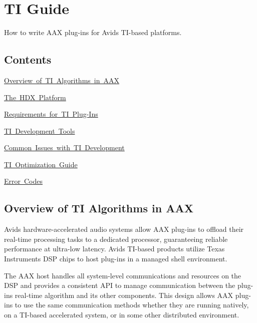 \hypertarget{a00832}{}\section{TI Guide}
\label{a00832}
How to write A\+AX plug-\/ins for Avid\textquotesingle{}s T\+I-\/based platforms. 

\hypertarget{a00832_aax_ti_guide_contents}{}\subsection{Contents}\label{a00832_aax_ti_guide_contents}
\begin{DoxyItemize}
\item \mbox{\hyperlink{a00832_aax_ti_guide_00_overview_of_ti_algorithms}{Overview of TI Algorithms in A\+AX}} \item \mbox{\hyperlink{a00832_aax_ti_guide_01_the_hdx_platform}{The H\+DX Platform}} \item \mbox{\hyperlink{a00832_aax_ti_guide_03_requirements_for_ti_plug_ins}{Requirements for TI Plug-\/\+Ins}} \item \mbox{\hyperlink{a00832_aax_ti_guide_04_ti_development_tools}{TI Development Tools}} \item \mbox{\hyperlink{a00832_aax_ti_guide_05_common_issues_with_ti_development}{Common Issues with TI Development}} \item \mbox{\hyperlink{a00832_aax_ti_guide_06_ti_optimization_guide}{TI Optimization Guide}} \item \mbox{\hyperlink{a00832_aax_ti_guide_07_error_codes}{Error Codes}}\end{DoxyItemize}
 \hypertarget{a00832_aax_ti_guide_00_overview_of_ti_algorithms}{}\subsection{Overview of T\+I Algorithms in A\+AX}\label{a00832_aax_ti_guide_00_overview_of_ti_algorithms}
Avid\textquotesingle{}s hardware-\/accelerated audio systems allow A\+AX plug-\/ins to offload their real-\/time processing tasks to a dedicated processor, guaranteeing reliable performance at ultra-\/low latency. Avid\textquotesingle{}s T\+I-\/based products utilize Texas Instruments D\+SP chips to host plug-\/ins in a managed shell environment.

The A\+AX host handles all system-\/level communications and resources on the D\+SP and provides a consistent A\+PI to manage communication between the plug-\/in\textquotesingle{}s real-\/time algorithm and its other components. This design allows A\+AX plug-\/ins to use the same communication methods whether they are running natively, on a T\+I-\/based accelerated system, or in some other distributed environment.

